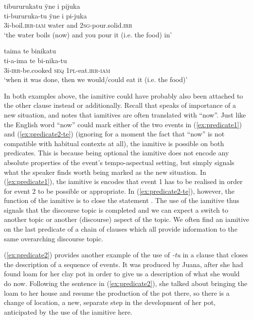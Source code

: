 \ea\label{ex:predicate1}
\begingl 
\glpreamble tibururukatu ÿne i pijuka\\
\gla ti-bururuka-tu ÿne i pi-juka\\ 
\glb 3i-boil.\textsc{irr}-\textsc{iam} water and 2\textsc{sg}-pour.solid.\textsc{irr}\\ 
\glft ‘the water boils (now) and you pour it (i.e. the food) in’
\trailingcitation{[jxx-d110923l-3]}
\xe

\ea\label{ex:predicate2-te}
\begingl 
\glpreamble taima te binikatu\\
\gla ti-a-ima te bi-nika-tu\\ 
\glb 3i-\textsc{irr}-be.cooked \textsc{seq} 1\textsc{pl}-eat.\textsc{irr}-\textsc{iam}\\ 
\glft ‘when it was done, then we would/could eat it (i.e. the food)’
\trailingcitation{[jxx-d110923l-2.25]}
\xe

In both examples above, the iamitive could have probably also been attached to the other clause instead or additionally. Recall that \citet[]{Ebert2001} speaks of importance of a new situation, and \citet[9]{Olsson2013} notes that iamitives are often translated with “now”. Just like the English word “now” could mark either of the two events in (\ref{ex:predicate1}) and (\ref{ex:predicate2-te}) (ignoring for a moment the fact that “now” is not compatible with habitual contexts at all), the iamitive is possible on both predicates. This is because being optional the iamitive does not encode any absolute properties of the event’s tempo-aspectual setting, but simply signals what the speaker finds worth being marked as the new situation. In (\ref{ex:predicate1}), the iamitive is encodes that event 1 has to be realised in order for event 2 to be possible or appropriate. In (\ref{ex:predicate2-te}), however, the function of the iamitive is to close the statement \citep[cf.][8]{Olsson2013}. The use of the iamitive thus signals that the discourse topic is completed and we can expect a switch to another topic or another (discourse) aspect of the topic. We often find an iamitive on the last predicate of a chain of clauses which all provide information to the same overarching discourse topic. 

(\ref{ex:predicate2}) provides another example of the use of \textit{-tu} in a clause that closes the description of a sequence of events. It was produced by Juana, after she had found loam for her clay pot in order to give us a description of what she would do now. Following the sentence in (\ref{ex:predicate2}), she talked about bringing the loam to her house and resume the production of the pot there, so there is a change of location, a new, separate step in the development of her pot, anticipated by the use of the iamitive here.

